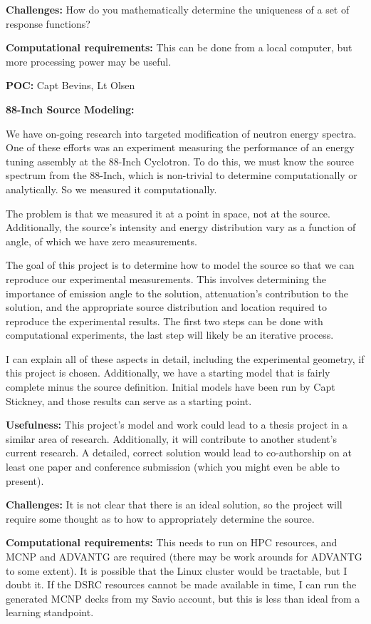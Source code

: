 \documentclass[12pt, answers]{exam}
\begin{document}
\begin{questions}
\textbf{Challenges:}
How do you mathematically determine the uniqueness of a set of response functions?

\textbf{Computational requirements:}
This can be done from a local computer, but more processing power may be useful.

\textbf{POC:} Capt Bevins, Lt Olsen
  
\newpage
 

\question \textbf{88-Inch Source Modeling:}

We have on-going research into targeted modification of neutron energy spectra.  
One of these efforts was an experiment measuring the performance of an energy tuning assembly at the 88-Inch Cyclotron.  
To do this, we must know the source spectrum from the 88-Inch, which is non-trivial to determine computationally or analytically.
So we measured it computationally.

The problem is that we measured it at a point in space, not at the source.
Additionally, the source's intensity and energy distribution vary as a function of angle, of which we have zero measurements.  

The goal of this project is to determine how to model the source so that we can reproduce our experimental measurements.
This involves determining the importance of emission angle to the solution, attenuation's contribution to the solution, and the appropriate source distribution and location required to reproduce the experimental results.
The first two steps can be done with computational experiments, the last step will likely be an iterative process.

I can explain all of these aspects in detail, including the experimental geometry, if this project is chosen.
Additionally, we have a starting model that is fairly complete minus the source definition.
Initial models have been run by Capt Stickney, and those results can serve as a starting point.

\textbf{Usefulness:} 
This project's model and work could lead to a thesis project in a similar area of research.  
Additionally, it will contribute to another student's current research.
A detailed, correct solution would lead to co-authorship on at least one paper and conference submission (which you might even be able to present).

\textbf{Challenges:}
It is not clear that there is an ideal solution, so the project will require some thought as to how to appropriately determine the source.

\textbf{Computational requirements:}
This needs to run on HPC resources, and MCNP and ADVANTG are required (there may be work arounds for ADVANTG to some extent).  
It is possible that the Linux cluster would be tractable, but I doubt it.
If the DSRC resources cannot be made available in time, I can run the generated MCNP decks from my Savio account, but this is less than ideal from a learning standpoint.


\end{questions}
\end{document}
